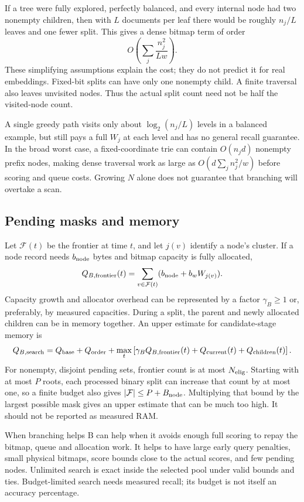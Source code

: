 If a tree were fully explored, perfectly balanced, and every internal node had two nonempty
children, then with $L$ documents per leaf there would be roughly $n_j/L$ leaves and one fewer
split. This gives a dense bitmap term of order
\begin{equation}
O\!\left(\sum_j\frac{n_j^2}{Lw}\right).
\label{eq:balanced-branch}
\end{equation}
These simplifying assumptions explain the cost; they do not predict it for real embeddings. Fixed-bit splits can
have only one nonempty child. A finite traversal also leaves unvisited nodes. Thus the actual
split count need not be half the visited-node count.

A single greedy path visits only about $\log_2(n_j/L)$ levels in a balanced example, but still
pays a full $W_j$ at each level and has no general recall guarantee. In the broad worst case,
a fixed-coordinate trie can contain $O(n_jd)$ nonempty prefix nodes, making dense traversal
work as large as $O(d\sum_j n_j^2/w)$ before scoring and queue costs. Growing $N$ alone does
not guarantee that branching will overtake a scan.

\subsection{Pending masks and memory}
Let $\mathcal F(t)$ be the frontier at time $t$, and let $j(v)$ identify a node's cluster.
If a node record needs $b_{\rm node}$ bytes and bitmap capacity is fully allocated,
\begin{equation}
Q_{B,\rm frontier}(t)=\sum_{v\in\mathcal F(t)}(b_{\rm node}+b_wW_{j(v)}).
\label{eq:frontier-memory}
\end{equation}
Capacity growth and allocator overhead can be represented by a factor $\gamma_B\geq1$ or,
preferably, by measured capacities. During a split, the parent and newly allocated children
can be in memory together. An upper estimate for candidate-stage memory is
\begin{equation}
Q_{B,\rm search}=Q_{\mathrm{base}}+Q_{\rm order}
 +\max_t\left[\gamma_B Q_{B,\rm frontier}(t)+Q_{\rm current}(t)+Q_{\rm children}(t)\right].
\label{eq:branch-ram}
\end{equation}
For nonempty, disjoint pending sets, frontier count is at most $N_{\mathrm{elig}}$. Starting with at most
$P$ roots, each processed binary split can increase that count by at most one, so a finite
budget also gives $|\mathcal F|\leq P+B_{\rm node}$. Multiplying that bound by the largest
possible mask gives an upper estimate that can be much too high. It should not be reported as measured RAM.

\begin{resultbox}{When branching helps}
B can help when it avoids enough full scoring to repay the bitmap, queue and allocation work.
It helps to have large early query penalties, small physical bitmaps, score bounds close to
the actual scores, and few pending nodes. Unlimited search is exact inside the selected pool under
valid bounds and ties. Budget-limited search needs measured recall; its budget is not itself
an accuracy percentage.
\end{resultbox}
